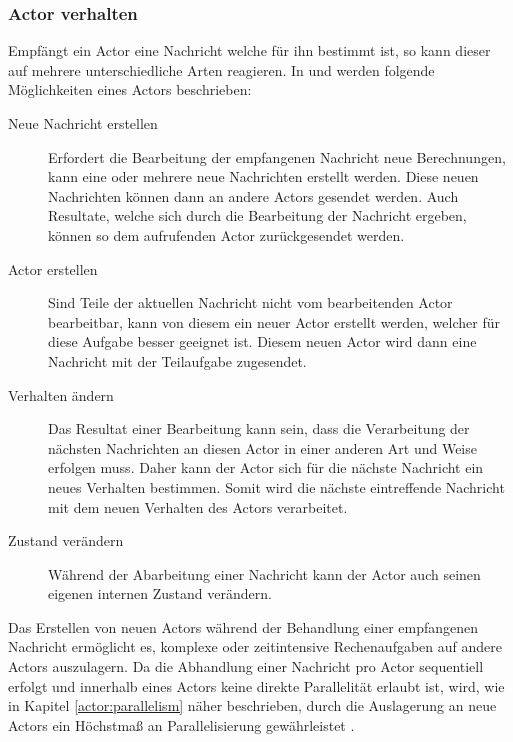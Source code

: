 \subsubsection{Actor verhalten}
\label{actorBehaviour}
Empfängt ein Actor eine Nachricht welche für ihn bestimmt ist, so kann dieser auf mehrere unterschiedliche Arten reagieren. In \citep{Agha1985ActorsSystems} und \citep{Vernon2015ReactiveAkka} werden folgende Möglichkeiten eines Actors beschrieben:
\begin{description}
  \item[Neue Nachricht erstellen] Erfordert die Bearbeitung der empfangenen Nachricht neue Berechnungen, kann eine oder mehrere neue Nachrichten erstellt werden. Diese neuen Nachrichten können dann an andere Actors gesendet werden. Auch Resultate, welche sich durch die Bearbeitung der Nachricht ergeben, können so dem aufrufenden Actor zurückgesendet werden.
  \item[Actor erstellen] Sind Teile der aktuellen Nachricht nicht vom bearbeitenden Actor bearbeitbar, kann von diesem ein neuer Actor erstellt werden, welcher für diese Aufgabe besser geeignet ist. Diesem neuen Actor wird dann eine Nachricht mit der Teilaufgabe zugesendet.
  \item[Verhalten ändern] Das Resultat einer Bearbeitung kann sein, dass die Verarbeitung der nächsten Nachrichten an diesen Actor in einer anderen Art und Weise erfolgen muss. Daher kann der Actor sich für die nächste Nachricht ein neues Verhalten bestimmen. Somit wird die nächste eintreffende Nachricht mit dem neuen Verhalten des Actors verarbeitet.
  \item[Zustand verändern] Während der Abarbeitung einer Nachricht kann der Actor auch seinen eigenen internen Zustand verändern.
\end{description}
Das Erstellen von neuen Actors während der Behandlung einer empfangenen Nachricht ermöglicht es, komplexe oder zeitintensive Rechenaufgaben auf andere Actors auszulagern. Da die Abhandlung einer Nachricht pro Actor sequentiell erfolgt und innerhalb eines Actors keine direkte Parallelität erlaubt ist, wird, wie in Kapitel \ref{actor:parallelism} näher beschrieben, durch die Auslagerung an neue Actors ein Höchstmaß an Parallelisierung gewährleistet \citep{Agha1985ConcurrentParallelism}.

